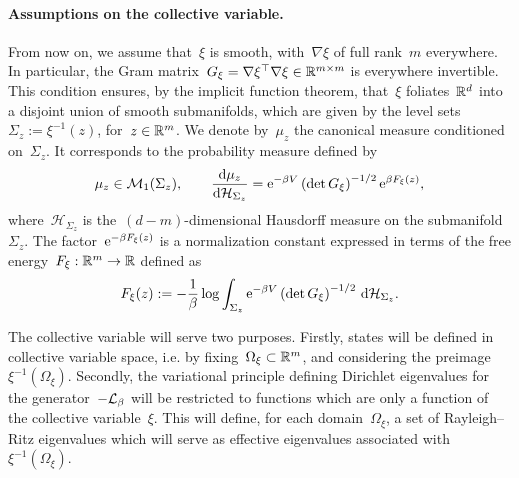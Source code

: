    \paragraph{Assumptions on the collective variable.}
    From now on, we assume that~$\xi$ is smooth, with~$\nabla \xi$ of full rank~$m$ everywhere. In particular, the Gram matrix~$G_\xi = \nabla\xi^\top\nabla\xi\in \mathbb{R}^{m\times m}$ is everywhere invertible. This condition ensures, by the implicit function theorem, that~$\xi$ foliates~$\mathbb{R}^d$ into a disjoint union of smooth submanifolds, which are given by the level sets~$\Sigma_z :=\xi^{-1}(z)$, for~$z\in\mathbb{R}^m$.
    We denote by~$\mu_z$ the canonical measure conditioned on~$\Sigma_z$. It corresponds to the probability measure defined by
    \begin{equation}
        \label{03:eq:conditional_measure}
        \mu_z\in \mathcal M_1(\Sigma_z),\qquad\frac{\mathrm{d} \mu_z}{\mathrm{d} \mathcal H_{\Sigma_z}} = \mathrm{e}^{-\beta V}\left(\det G_\xi\right)^{-1/2}\mathrm{e}^{\beta F_\xi(z)},
    \end{equation}
    where~$\mathcal H_{\Sigma_z}$ is the~$(d-m)$-dimensional Hausdorff measure on the submanifold~$\Sigma_z$. The factor~$\mathrm{e}^{-\beta F_\xi(z)}$ is a normalization constant expressed in terms of the free energy~$F_\xi:\mathbb{R}^m\to\mathbb{R}$ defined as
    \begin{equation}
        \label{03:eq:free_energy}
        F_\xi(z) :=-\frac1\beta\log\displaystyle\int_{\Sigma_z}\mathrm{e}^{-\beta V}\left(\det G_\xi\right)^{-1/2}\,\mathrm{d}\mathcal H_{\Sigma_z}.
    \end{equation}

    The collective variable will serve two purposes. Firstly, states will be defined in collective variable space, i.e. by fixing~$\Omega_\xi\subset \mathbb{R}^m$, and considering the preimage~$\xi^{-1}(\Omega_\xi)$. Secondly, the variational principle defining Dirichlet eigenvalues for the generator~$-\mathcal{L}_\beta$ will be restricted to functions which are only a function of the collective variable~$\xi$. This will define, for each domain~$\Omega_\xi$, a set of Rayleigh--Ritz eigenvalues which will serve as effective eigenvalues associated with~$\xi^{-1}(\Omega_\xi)$.

